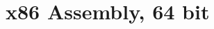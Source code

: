 \documentclass[11pt,twoside]{book}
\begin{document}
\chapter{x86 Assembly, 64 bit}


%
%
\end{document}
